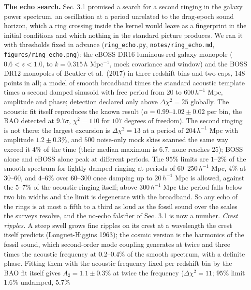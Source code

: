 \documentclass[
  11pt,
]{article}
\begin{document}
\textbf{The echo search.} Sec. 3.1 promised a search for a second
ringing in the galaxy power spectrum, an oscillation at a period
unrelated to the drag-epoch sound horizon, which a ring crossing inside
the kernel would leave as a fingerprint in the initial conditions and
which nothing in the standard picture produces. We ran it with
thresholds fixed in advance (\texttt{ring\_echo.py},
\texttt{notes/ring\_echo.md}, \texttt{figures/ring\_echo.png}): the
eBOSS DR16 luminous-red-galaxy monopole (\(0.6 < z < 1.0\), to
\(k = 0.315\,h\) Mpc\(^{-1}\), mock covariance and window) and the BOSS
DR12 monopoles of Beutler et al.~(2017) in three redshift bins and two
caps, \(148\) points in all; a model of smooth broadband times the
standard acoustic template times a second damped sinusoid with free
period from \(20\) to \(600\,h^{-1}\) Mpc, amplitude and phase;
detection declared only above \(\Delta\chi^2 = 25\) globally. The
acoustic fit itself reproduces the known result
(\(\alpha = 0.99\)--\(1.02 \pm 0.02\) per bin, the BAO detected at
\(9.7\sigma\), \(\chi^2 = 110\) for \(107\) degrees of freedom). The
second ringing is not there: the largest excursion is
\(\Delta\chi^2 = 13\) at a period of \(204\,h^{-1}\) Mpc with amplitude
\(1.2 \pm 0.3\%\), and \(500\) noise-only mock skies scanned the same
way exceed it \(4\%\) of the time (their median maximum is \(6.7\), none
reaches \(25\)); BOSS alone and eBOSS alone peak at different periods.
The \(95\%\) limits are \(1\)--\(2\%\) of the smooth spectrum for
lightly damped ringing at periods of \(60\)--\(250\,h^{-1}\) Mpc,
\(4\%\) at \(30\)--\(60\), and \(4\)--\(6\%\) over \(60\)--\(300\) once
damping up to \(20\,h^{-1}\) Mpc is allowed, against the \(5\)--\(7\%\)
of the acoustic ringing itself; above \(300\,h^{-1}\) Mpc the period
falls below two bin widths and the limit is degenerate with the
broadband. So any echo of the rings is at most a fifth to a third as
loud as the fossil sound over the scales the surveys resolve, and the
no-echo falsifier of Sec. 3.1 is now a number. \emph{Crest ripples.} A
steep swell grows fine ripples on its crest at a wavelength the crest
itself predicts (Longuet-Higgins 1963); the cosmic version is the
harmonics of the fossil sound, which second-order mode coupling
generates at twice and three times the acoustic frequency at
\(0.2\)--\(0.4\%\) of the smooth spectrum, with a definite phase.
Fitting them with the acoustic frequency fixed per redshift bin by the
BAO fit itself gives \(A_2 = 1.1 \pm 0.3\%\) at twice the frequency
(\(\Delta\chi^2 = 11\); \(95\%\) limit \(1.6\%\) undamped, \(5.7\%\)
\end{document}
